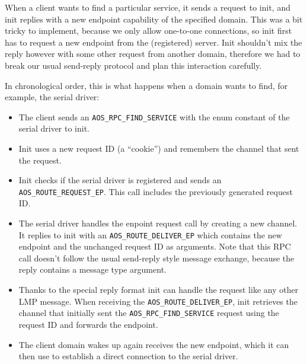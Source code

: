 \documentclass[a4paper,10pt]{article}
\begin{document}
When a client wants to find a particular service, it sends a request to init, and init replies with a new endpoint capability of the specified domain.
This was a bit tricky to implement, because we only allow one-to-one connections, so init first has to request a new endpoint from the (registered) server.
Init shouldn't mix the reply however with some other request from another domain, therefore we had to break our usual send-reply protocol and plan this interaction carefully.

In chronological order, this is what happens when a domain wants to find, for example, the serial driver:

\begin{itemize}
 \item The client sends an \lstinline!AOS_RPC_FIND_SERVICE! with the enum constant of the serial driver to init.
 \item Init uses a new request ID (a ``cookie'') and remembers the channel that sent the request.
 \item Init checks if the serial driver is registered and sends an \lstinline!AOS_ROUTE_REQUEST_EP!.
 This call includes the previously generated request ID.
 \item The serial driver handles the enpoint request call by creating a new channel.
 It replies to init with an \lstinline!AOS_ROUTE_DELIVER_EP! which contains the new endpoint and the unchanged request ID as arguments.
 Note that this RPC call doesn't follow the usual send-reply style message exchange, because the reply contains a message type argument.
 \item Thanks to the special reply format init can handle the request like any other LMP message.
 When receiving the \lstinline!AOS_ROUTE_DELIVER_EP!, init retrieves the channel that initially sent the \lstinline!AOS_RPC_FIND_SERVICE! request using the request ID and forwards the endpoint.
 \item The client domain wakes up again receives the new endpoint, which it can then use to establish a direct connection to the serial driver.
\end{itemize}


\end{document}
